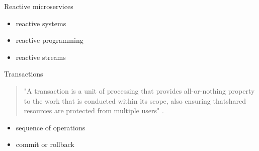 \documentclass{beamer}
\begin{document}
    \begin{frame}{Reactive microservices}
       \begin{itemize}
           \item reactive systems
           \item reactive programming
           \item reactive streams
       \end{itemize}
    \hfill \break
    \hfill \break
    \hfill \break
    \hfill \break
    \hfill \break
    \hfill \break
    \hfill \break
    \end{frame}

    \begin{frame}{Transactions}
    
     \begin{quotation}
         \begin{center}
             "A transaction is a unit of processing that provides all-or-nothing property to the work that is conducted within its scope, also ensuring thatshared resources are protected from multiple users" \cite{java_transaction_processing}.
         \end{center}
     \end{quotation}
     \Large
        \begin{itemize}
            \item sequence of operations
            \item commit or rollback
        \end{itemize}
        \hfill \break
        \hfill \break
        
    \end{frame}
    
\end{document}
